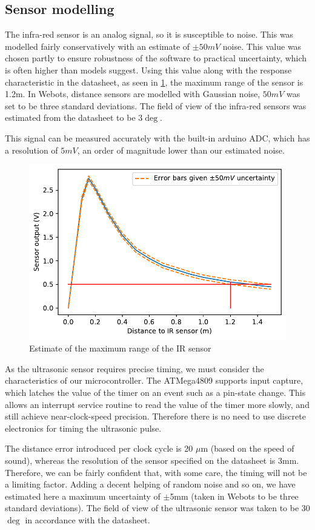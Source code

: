 \subsection{Sensor modelling}

The infra-red sensor is an analog signal, so it is susceptible to noise. This was modelled fairly conservatively with an estimate of $\pm50mV$ noise. This value was chosen partly to ensure robustness of the software to practical uncertainty, which is often higher than models suggest. Using this value along with the response characteristic in the datasheet, as seen in \cref{fig:ir_error}, the maximum range of the sensor is 1.2m. In Webots, distance sensors are modelled with Gaussian noise, $50mV$ was set to be three standard deviations. The field of view of the infra-red sensors was estimated from the datasheet to be 3$\deg$.

This signal can be measured accurately with the built-in arduino ADC, which has a resolution of $5mV$, an order of magnitude lower than our estimated noise.


\begin{figure}[H]
	\centering
	\includegraphics[width=0.6\linewidth]{ir_error}
	\caption{Estimate of the maximum range of the IR sensor}%
	\label{fig:ir_error}
\end{figure}

As the ultrasonic sensor requires precise timing, we must consider the characteristics of our microcontroller. The ATMega4809 supports input capture, which latches the value of the timer on an event such as a pin-state change. This allows an interrupt service routine to read the value of the timer more slowly, and still achieve near-clock-speed precision. Therefore there is no need to use discrete electronics for timing the ultrasonic pulse.

The distance error introduced per clock cycle is 20 $\mu$m (based on the speed of sound), whereas the resolution of the sensor specified on the datasheet is 3mm.  Therefore, we can be fairly confident that, with some care, the timing will not be a limiting factor. Adding a decent helping of random noise and so on, we have estimated here a maximum uncertainty of $\pm$5mm (taken in Webots to be three standard deviations). The field of view of the ultrasonic sensor was taken to be 30$\deg$ in accordance with the datasheet.


